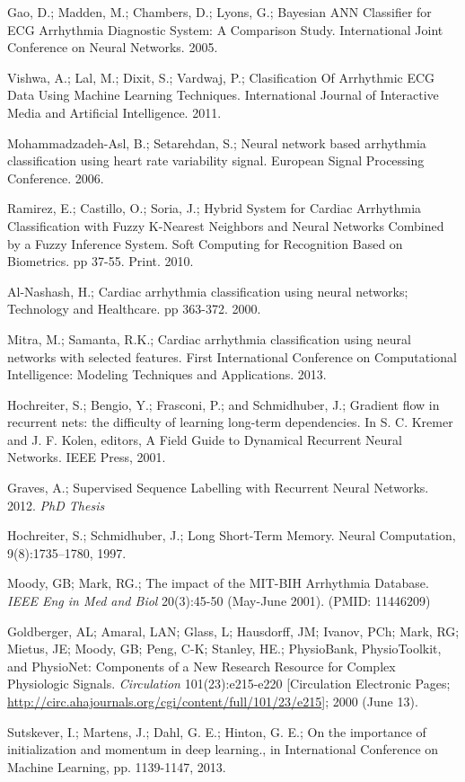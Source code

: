 \documentclass{article} %
\begin{document}
\begin{thebibliography}{9}

Gao, D.; Madden, M.; Chambers, D.; Lyons, G.; Bayesian ANN Classifier for ECG Arrhythmia Diagnostic System: A Comparison Study. International Joint Conference on Neural Networks. 2005.

Vishwa, A.; Lal, M.; Dixit, S.; Vardwaj, P.; Clasification Of Arrhythmic ECG Data Using Machine Learning Techniques. International Journal of Interactive Media and Artificial Intelligence. 2011.

 Mohammadzadeh-Asl, B.; Setarehdan, S.; Neural network based arrhythmia classification using heart rate variability signal. European Signal Processing Conference. 2006.

Ramirez, E.; Castillo, O.; Soria, J.; Hybrid System for Cardiac Arrhythmia Classification with Fuzzy K-Nearest Neighbors and Neural Networks Combined by a Fuzzy Inference System. Soft Computing for Recognition Based on Biometrics. pp 37-55. Print. 2010.

Al-Nashash, H.; Cardiac arrhythmia classification using neural networks; Technology and Healthcare. pp 363-372. 2000.

Mitra, M.; Samanta, R.K.; Cardiac arrhythmia classification using neural networks with selected features. First International Conference on Computational Intelligence: Modeling Techniques and Applications. 2013.

Hochreiter, S.; Bengio, Y.; Frasconi, P.; and Schmidhuber, J.; Gradient flow in recurrent nets: the difficulty of learning long-term dependencies. In S. C. Kremer and J. F. Kolen, editors, A Field Guide to Dynamical Recurrent Neural Networks. IEEE Press, 2001.

Graves, A.; Supervised Sequence Labelling with Recurrent Neural Networks. 2012. \textit{PhD Thesis}

Hochreiter, S.; Schmidhuber, J.; Long Short-Term Memory. Neural Computation, 9(8):1735–1780, 1997.

Moody, GB; Mark, RG.; The impact of the MIT-BIH Arrhythmia Database. \textit{IEEE Eng in Med and Biol} 20(3):45-50 (May-June 2001). (PMID: 11446209)
 
Goldberger, AL; Amaral, LAN; Glass, L; Hausdorff, JM; Ivanov, PCh; Mark, RG; Mietus, JE; Moody, GB; Peng, C-K; Stanley, HE.; PhysioBank, PhysioToolkit, and PhysioNet: Components of a New Research Resource for Complex Physiologic Signals. \textit{Circulation} 101(23):e215-e220 [Circulation Electronic Pages; \url{http://circ.ahajournals.org/cgi/content/full/101/23/e215}]; 2000 (June 13).

Sutskever, I.; Martens, J.; Dahl, G. E.; Hinton, G. E.; On the importance of initialization and momentum in deep learning., in International Conference on Machine Learning, pp. 1139-1147, 2013.

\end{thebibliography}
\end{document}
